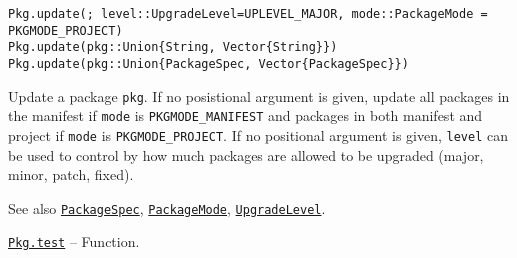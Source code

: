 \begin{adjustwidth}{2em}{0pt}


\begin{verbatim}
Pkg.update(; level::UpgradeLevel=UPLEVEL_MAJOR, mode::PackageMode = PKGMODE_PROJECT)
Pkg.update(pkg::Union{String, Vector{String}})
Pkg.update(pkg::Union{PackageSpec, Vector{PackageSpec}})
\end{verbatim}

Update a package \texttt{pkg}. If no posistional argument is given, update all packages in the manifest if \texttt{mode} is \texttt{PKGMODE\_MANIFEST} and packages in both manifest and project if \texttt{mode} is \texttt{PKGMODE\_PROJECT}. If no positional argument is given, \texttt{level} can be used to control by how much packages are allowed to be upgraded (major, minor, patch, fixed).

See also \hyperlink{7769325907319883786}{\texttt{PackageSpec}}, \hyperlink{3271836720350904911}{\texttt{PackageMode}}, \hyperlink{13785530562686832335}{\texttt{UpgradeLevel}}.



\end{adjustwidth}
\hypertarget{7033600981039054461}{} 
\hyperlink{7033600981039054461}{\texttt{Pkg.test}}  -- {Function.}

